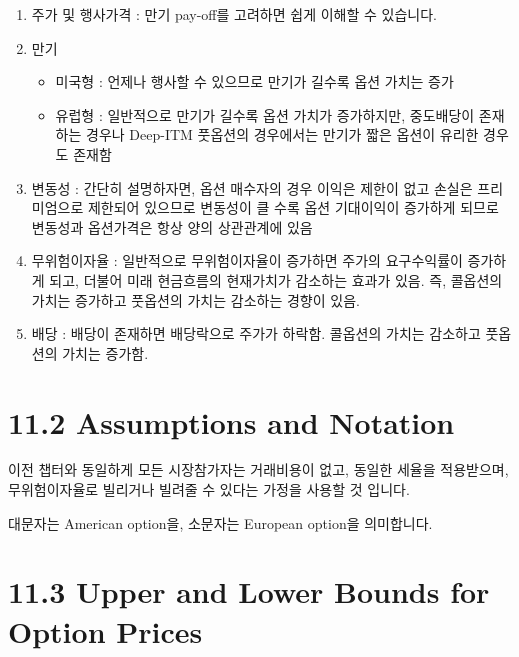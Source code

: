\documentclass[
  letterpaper,
  DIV=11,
  numbers=noendperiod]{scrreprt}
\providecommand{\tightlist}{%
  \setlength{\itemsep}{0pt}\setlength{\parskip}{0pt}}\usepackage{longtable,booktabs,array}
\begin{document}
\begin{enumerate}
\def\labelenumi{\arabic{enumi}.}
\tightlist
\item
  주가 및 행사가격 : 만기 pay-off를 고려하면 쉽게 이해할 수 있습니다.
\item
  만기

  \begin{itemize}
  \tightlist
  \item
    미국형 : 언제나 행사할 수 있으므로 만기가 길수록 옵션 가치는 증가
  \item
    유럽형 : 일반적으로 만기가 길수록 옵션 가치가 증가하지만, 중도배당이
    존재하는 경우나 Deep-ITM 풋옵션의 경우에서는 만기가 짧은 옵션이
    유리한 경우도 존재함
  \end{itemize}
\item
  변동성 : 간단히 설명하자면, 옵션 매수자의 경우 이익은 제한이 없고
  손실은 프리미엄으로 제한되어 있으므로 변동성이 클 수록 옵션 기대이익이
  증가하게 되므로 변동성과 옵션가격은 항상 양의 상관관계에 있음
\item
  무위험이자율 : 일반적으로 무위험이자율이 증가하면 주가의 요구수익률이
  증가하게 되고, 더불어 미래 현금흐름의 현재가치가 감소하는 효과가 있음.
  즉, 콜옵션의 가치는 증가하고 풋옵션의 가치는 감소하는 경향이 있음.
\item
  배당 : 배당이 존재하면 배당락으로 주가가 하락함. 콜옵션의 가치는
  감소하고 풋옵션의 가치는 증가함.
\end{enumerate}

\section*{11.2 Assumptions and
Notation}\label{assumptions-and-notation-1}


이전 챕터와 동일하게 모든 시장참가자는 거래비용이 없고, 동일한 세율을
적용받으며, 무위험이자율로 빌리거나 빌려줄 수 있다는 가정을 사용할 것
입니다.

대문자는 American option을, 소문자는 European option을 의미합니다.

\section*{11.3 Upper and Lower Bounds for Option
Prices}\label{upper-and-lower-bounds-for-option-prices}
\end{document}
